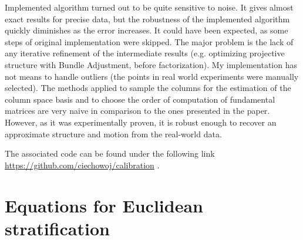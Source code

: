 \documentclass[12pt]{article}
\begin{document}
Implemented algorithm turned out to be quite sensitive to noise. It gives almost
exact results for precise data, but the robustness of the implemented algorithm
quickly diminishes as the error increases. It could have been expected, as some
steps of original implementation \cite{svoboda05} were skipped. The major
problem is the lack of any iterative refinement of the intermediate results (e.g.
optimizing projective structure with Bundle Adjustment, before factorization).
My implementation has not means to handle outliers (the points in real world
experiments were manually selected). The methods applied to sample the columns for
the estimation of the column space basis and to choose the order of computation
of fundamental matrices are very naive in comparison to the ones presented in
the paper. However, as it was experimentally proven, it is robust enough to
recover an approximate structure and motion from the real-world data.

\FloatBarrier




The associated code can be found under the following link \url{https://github.com/ciechowoj/calibration} .

\newpage

\section{Equations for Euclidean stratification}
\end{document}
